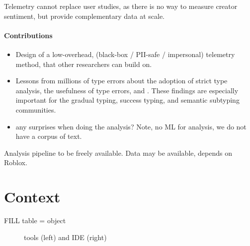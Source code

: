 \documentclass[
  acmsmall,
  review,
  anonymous,
]{acmart}
\begin{document}
Telemetry cannot replace user studies, as there is no way to measure
creator sentiment, but provide complementary data at scale.

\paragraph{Contributions}
\begin{itemize}
  \item
    Design of a low-overhead, (black-box / PII-safe / impersonal)
    telemetry method, that other
    researchers can build on.

  \item
    Lessons from millions of type errors about
    the adoption of strict type analysis,
    the usefulness of type errors,
    and \FILL{}.
    These findings are especially important for the
    gradual typing, success typing, and semantic subtyping communities.

  \item
    \FILL{} any surprises when doing the analysis?
    Note, no ML for analysis, we do not have a corpus of text.

\end{itemize}

Analysis pipeline to be freely available.
Data may be available, depends on Roblox.


\section{ Context}

FILL table = object

\begin{figure}
  \caption{ tools (left) and IDE (right)}
  \label{fig:roblox-studio}
\end{figure}
      
\end{document}
